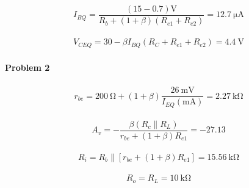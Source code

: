 \documentclass{article}
\begin{document}
\begin{equation*}
  \begin{aligned}
    I_{BQ} = \dfrac{\left( 15 - 0.7 \right) \mathrm{V}}{R_b + \left( 1 + \beta \right) \left( R_{e1} + R_{e2} \right)} = 12.7 \  \mathrm{\mu A}
  \end{aligned}
\end{equation*}

\begin{equation*}
  \begin{aligned}
    V_{CEQ} = 30 - \beta I_{BQ} \left( R_C + R_{e1} + R_{e2} \right) = 4.4 \  \mathrm{V}
  \end{aligned}
\end{equation*}

\paragraph{Problem 2}

\begin{equation*}
  \begin{aligned}
    r_{be} = 200 \  \mathrm{\Omega} + \left( 1 + \beta \right) \dfrac{26 \  \mathrm{mV}}{I_{EQ} \left( \mathrm{mA} \right)} = 2.27 \  \mathrm{k \Omega}
  \end{aligned}
\end{equation*}

\begin{equation*}
  \begin{aligned}
    A_v = - \dfrac{\beta \left( R_c \parallel R_L \right)}{r_{be} + \left( 1 + \beta \right) R_{e1}} = - 27.13
  \end{aligned}
\end{equation*}

\begin{equation*}
  \begin{aligned}
    R_i = R_b \parallel \left[ r_{be} + \left( 1 + \beta \right) R_{e1} \right] = 15.56 \  \mathrm{k \Omega}
  \end{aligned}
\end{equation*}

\begin{equation*}
  \begin{aligned}
    R_o = R_L = 10 \  \mathrm{k \Omega}
  \end{aligned}
\end{equation*}
\end{document}
